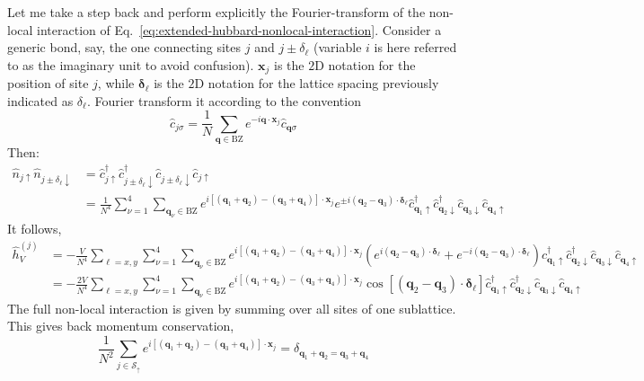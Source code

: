 Let me take a step back and perform explicitly the Fourier-transform of the non-local interaction of Eq.~\ref{eq:extended-hubbard-nonlocal-interaction}. Consider a generic bond, say, the one connecting sites $j$ and $j\pm\delta_\ell$ (variable $i$ is here referred to as the imaginary unit to avoid confusion). $\mathbf{x}_j$ is the $2$D notation for the position of site $j$, while $\bm{\delta}_\ell$ is the $2$D notation for the lattice spacing previously indicated as $\delta_\ell$. Fourier transform it according to the convention
\[
	\hat c_{j\sigma} = \frac{1}{N} \sum_{\mathbf{q} \in \mathrm{BZ}} e^{-i \mathbf{q} \cdot \mathbf{x}_j} \hat c_{\mathbf{q}\sigma}
\]
Then:
\[
\begin{aligned}
	\hat n_{j\uparrow} \hat n_{j \pm \delta_\ell \downarrow} &= \hat c_{j\uparrow}^\dagger \hat c_{j \pm \delta_\ell \downarrow}^\dagger \hat c_{j \pm \delta_\ell \downarrow} \hat c_{j\uparrow} \\
	&= \frac{1}{N^4} \sum_{\nu=1}^4 \sum_{\mathbf{q}_\nu \in \mathrm{BZ}} e^{i \left[ (\mathbf{q}_1 + \mathbf{q}_2) - (\mathbf{q}_3 + \mathbf{q}_4) \right] \cdot \mathbf{x}_j} e^{\pm i(\mathbf{q}_2-\mathbf{q}_3) \cdot \bm{\delta}_\ell}  \hat c_{\mathbf{q}_1 \uparrow}^\dagger \hat c_{\mathbf{q}_2 \downarrow}^\dagger \hat c_{\mathbf{q}_3 \downarrow} \hat c_{\mathbf{q}_4\uparrow}
\end{aligned}
\]
It follows,
\[
\begin{aligned}
	\hat h_V^{(j)} &= -\frac{V}{N^4} \sum_{\ell = x,y} \sum_{\nu=1}^4 \sum_{\mathbf{q}_\nu \in \mathrm{BZ}} e^{i \left[ (\mathbf{q}_1 + \mathbf{q}_2) - (\mathbf{q}_3 + \mathbf{q}_4) \right] \cdot \mathbf{x}_j} 
	\left(
		e^{ i(\mathbf{q}_2-\mathbf{q}_3) \cdot \bm{\delta}_\ell} + e^{ -i(\mathbf{q}_2-\mathbf{q}_3) \cdot \bm{\delta}_\ell} 
	\right)
	\hat c_{\mathbf{q}_1 \uparrow}^\dagger \hat c_{\mathbf{q}_2 \downarrow}^\dagger \hat c_{\mathbf{q}_3 \downarrow} \hat c_{\mathbf{q}_4\uparrow} \\
	&= -\frac{2V}{N^4} \sum_{\ell = x,y} \sum_{\nu=1}^4 \sum_{\mathbf{q}_\nu \in \mathrm{BZ}} e^{i \left[ (\mathbf{q}_1 + \mathbf{q}_2) - (\mathbf{q}_3 + \mathbf{q}_4) \right] \cdot \mathbf{x}_j} \cos\left[
		(\mathbf{q}_2-\mathbf{q}_3) \cdot \bm{\delta}_\ell
	\right]	\hat c_{\mathbf{q}_1 \uparrow}^\dagger \hat c_{\mathbf{q}_2 \downarrow}^\dagger \hat c_{\mathbf{q}_3 \downarrow} \hat c_{\mathbf{q}_4\uparrow}
\end{aligned}
\]
The full non-local interaction is given by summing over all sites of one sublattice. This gives back momentum conservation,
\[
	\frac{1}{N^2} \sum_{j \in \mathcal{S}_\uparrow} e^{i \left[ (\mathbf{q}_1 + \mathbf{q}_2) - (\mathbf{q}_3 + \mathbf{q}_4) \right] \cdot \mathbf{x}_j} = \delta_{\mathbf{q}_1 + \mathbf{q}_2 = \mathbf{q}_3 + \mathbf{q}_4}
\]
